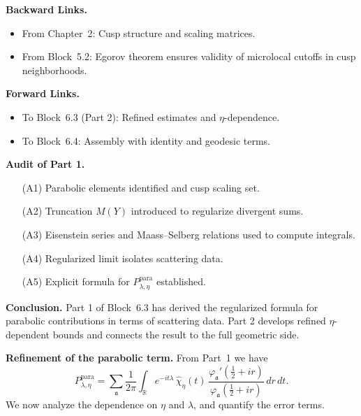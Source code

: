 \noindent\textbf{Backward Links.}
\begin{itemize}
  \item From Chapter~2: Cusp structure and scaling matrices.
  \item From Block~5.2: Egorov theorem ensures validity of microlocal cutoffs in cusp neighborhoods.
\end{itemize}

\medskip

\noindent\textbf{Forward Links.}
\begin{itemize}
  \item To Block~6.3 (Part 2): Refined estimates and $\eta$-dependence.
  \item To Block~6.4: Assembly with identity and geodesic terms.
\end{itemize}

\medskip

\noindent\textbf{Audit of Part 1.}
\begin{itemize}
  \item[(A1)] Parabolic elements identified and cusp scaling set.
  \item[(A2)] Truncation $M(Y)$ introduced to regularize divergent sums.
  \item[(A3)] Eisenstein series and Maass–Selberg relations used to compute integrals.
  \item[(A4)] Regularized limit isolates scattering data.
  \item[(A5)] Explicit formula for $P_{\lambda,\eta}^{\text{para}}$ established.
\end{itemize}

\medskip

\noindent\textbf{Conclusion.}
Part 1 of Block~6.3 has derived the regularized formula for parabolic contributions in terms of scattering data.
Part 2 develops refined $\eta$-dependent bounds and connects the result to the full geometric side.



\noindent\textbf{Refinement of the parabolic term.}
From Part~1 we have
\[
  P_{\lambda,\eta}^{\text{para}}
  = \sum_{\mathfrak{a}} \frac{1}{2\pi}\int_{\mathbb{R}}
  e^{-it\lambda}\,\widehat{\chi}_\eta(t)\,
  \frac{\varphi_\mathfrak{a}'(\tfrac12+ir)}{\varphi_\mathfrak{a}(\tfrac12+ir)}\, dr\, dt.
\]
We now analyze the dependence on $\eta$ and $\lambda$, and quantify the error terms.

